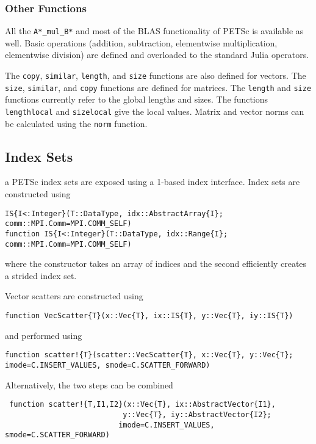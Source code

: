 \documentclass{article}
\newcommand{\ttt}{\texttt}
\begin{document}
\subsubsection{Other Functions}
All the \ttt{A*\_mul\_B*} and most of the BLAS functionality of PETSc is available as well.
Basic operations (addition, subtraction, elementwise multiplication, elementwise division) are defined and overloaded to the standard Julia operators.

The \ttt{copy}, \ttt{similar}, \ttt{length}, and \ttt{size} functions are also defined for vectors.
The \ttt{size}, \ttt{similar}, and \ttt{copy} functions are defined for matrices.
The \ttt{length} and \ttt{size} functions currently refer to the global lengths and sizes.
The functions \ttt{lengthlocal} and \ttt{sizelocal} give the local values.
Matrix and vector norms can be calculated using the \ttt{norm} function.


\subsection{Index Sets} \label{sec:is}a
PETSc index sets are exposed using a 1-based index interface.
Index sets are constructed using

\begin{verbatim}
IS{I<:Integer}(T::DataType, idx::AbstractArray{I}; comm::MPI.Comm=MPI.COMM_SELF)
function IS{I<:Integer}(T::DataType, idx::Range{I}; comm::MPI.Comm=MPI.COMM_SELF)
\end{verbatim}

where the constructor takes an array of indices and the second efficiently creates a strided index set.

Vector scatters are constructed using

\begin{verbatim}
function VecScatter{T}(x::Vec{T}, ix::IS{T}, y::Vec{T}, iy::IS{T})
\end{verbatim}

and performed using

\begin{verbatim}
function scatter!{T}(scatter::VecScatter{T}, x::Vec{T}, y::Vec{T}; imode=C.INSERT_VALUES, smode=C.SCATTER_FORWARD)
\end{verbatim}

Alternatively, the two steps can be combined
\begin{verbatim}
 function scatter!{T,I1,I2}(x::Vec{T}, ix::AbstractVector{I1},
                           y::Vec{T}, iy::AbstractVector{I2};
                          imode=C.INSERT_VALUES, smode=C.SCATTER_FORWARD)
\end{verbatim}
\end{document}
